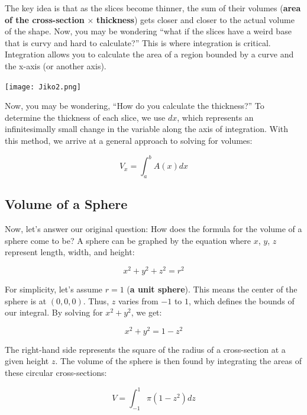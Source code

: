 \documentclass{article}
\begin{document}
\begin{multicols}{2}
The key idea is that as the slices become thinner, the sum of their volumes (\textbf{area of the cross-section} $\times$ \textbf{thickness}) gets closer and closer to the actual volume of the shape. Now, you may be wondering “what if the slices have a weird base that is curvy and hard to calculate?” This is where integration is critical. Integration allows you to calculate the area of a region bounded by a curve and the x-axis (or another axis).
\begin{center}
    \texttt{[image: Jiko2.png]}
\end{center}
Now, you may be wondering, “How do you calculate the thickness?” To determine the thickness of each slice, we use $dx$, which represents an infinitesimally small change in the variable along the axis of integration. With this method, we arrive at a general approach to solving for volumes:

\begin{equation*}
    V_x = \int_{a}^{b} A(x)dx
\end{equation*}

\subsection*{Volume of a Sphere}

Now, let's answer our original question: How does the formula for the volume of a sphere come to be? A sphere can be graphed by the equation where $x$, $y$, $z$ represent length, width, and height:

\begin{equation*}
    x^2 + y^2 + z^2 = r^2
\end{equation*}

For simplicity, let’s assume $r = 1$ (\textbf{a unit sphere}). This means the center of the sphere is at $(0, 0, 0)$. Thus, $z$ varies from $-1$ to $1$, which defines the bounds of our integral. By solving for $x^2 + y^2$, we get:

\begin{equation*}
    x^2 + y^2 = 1 - z^2
\end{equation*}

The right-hand side represents the square of the radius of a cross-section at a given height $z$. The volume of the sphere is then found by integrating the areas of these circular cross-sections:

\begin{equation*}
    V = \int_{-1}^{1} \pi(1 - z^2)dz
\end{equation*}


\end{multicols}
\end{document}
